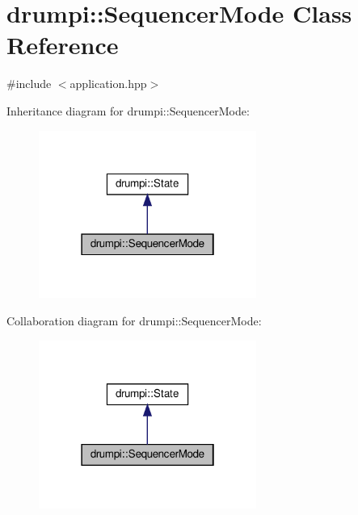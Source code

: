 \hypertarget{classdrumpi_1_1SequencerMode}{}\section{drumpi\+:\+:Sequencer\+Mode Class Reference}
\label{classdrumpi_1_1SequencerMode}


{\ttfamily \#include $<$application.\+hpp$>$}



Inheritance diagram for drumpi\+:\+:Sequencer\+Mode\+:
\nopagebreak
\begin{figure}[H]
\begin{center}
\leavevmode
\includegraphics[width=202pt]{classdrumpi_1_1SequencerMode__inherit__graph}
\end{center}
\end{figure}


Collaboration diagram for drumpi\+:\+:Sequencer\+Mode\+:
\nopagebreak
\begin{figure}[H]
\begin{center}
\leavevmode
\includegraphics[width=202pt]{classdrumpi_1_1SequencerMode__coll__graph}
\end{center}
\end{figure}
